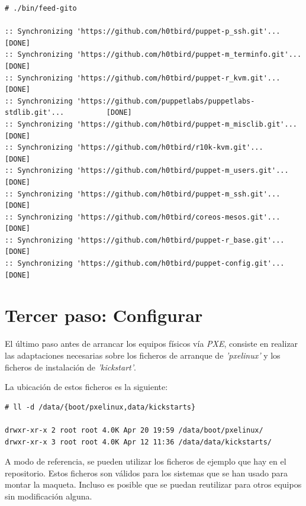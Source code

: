 \documentclass[a4paper,12pt,spanish,final]{epsc_tfc_pfc}
\begin{document}
\begin{lstlisting}[style=dnsmasq]
# ./bin/feed-gito

:: Synchronizing 'https://github.com/h0tbird/puppet-p_ssh.git'...                  [DONE]
:: Synchronizing 'https://github.com/h0tbird/puppet-m_terminfo.git'...             [DONE]
:: Synchronizing 'https://github.com/h0tbird/puppet-r_kvm.git'...                  [DONE]
:: Synchronizing 'https://github.com/puppetlabs/puppetlabs-stdlib.git'...          [DONE]
:: Synchronizing 'https://github.com/h0tbird/puppet-m_misclib.git'...              [DONE]
:: Synchronizing 'https://github.com/h0tbird/r10k-kvm.git'...                      [DONE]
:: Synchronizing 'https://github.com/h0tbird/puppet-m_users.git'...                [DONE]
:: Synchronizing 'https://github.com/h0tbird/puppet-m_ssh.git'...                  [DONE]
:: Synchronizing 'https://github.com/h0tbird/coreos-mesos.git'...                  [DONE]
:: Synchronizing 'https://github.com/h0tbird/puppet-r_base.git'...                 [DONE]
:: Synchronizing 'https://github.com/h0tbird/puppet-config.git'...                 [DONE]
\end{lstlisting}

\section{Tercer paso: Configurar}

El último paso antes de arrancar los equipos físicos vía \emph{PXE}, consiste en realizar las adaptaciones necesarias sobre los ficheros de arranque de \emph{'pxelinux'} y los ficheros de instalación de \emph{'kickstart'}.

La ubicación de estos ficheros es la siguiente:\\

\begin{lstlisting}[style=dnsmasq]
# ll -d /data/{boot/pxelinux,data/kickstarts}

drwxr-xr-x 2 root root 4.0K Apr 20 19:59 /data/boot/pxelinux/
drwxr-xr-x 3 root root 4.0K Apr 12 11:36 /data/data/kickstarts/
\end{lstlisting}

A modo de referencia, se pueden utilizar los ficheros de ejemplo que hay en el repositorio. Estos ficheros son válidos para los sistemas que se han usado para montar la maqueta. Incluso es posible que se puedan reutilizar para otros equipos sin modificación alguna.

\end{document}
